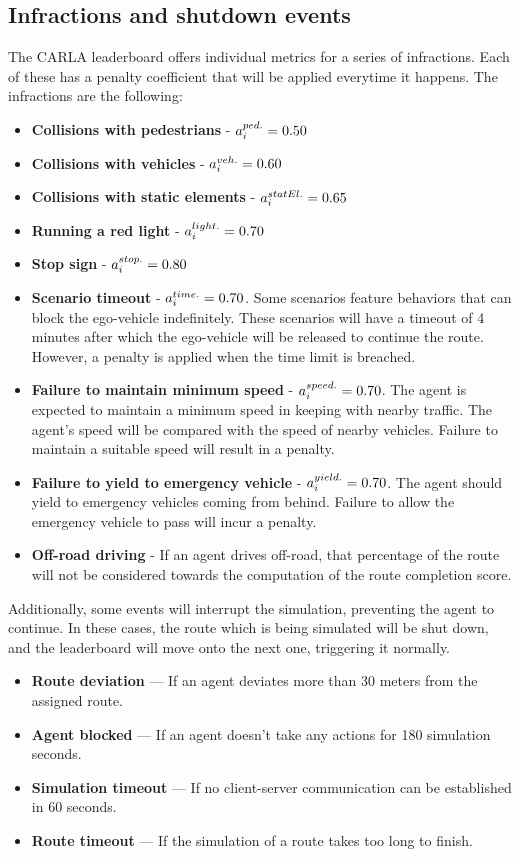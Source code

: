 \documentclass{article}
\begin{document}
\subsection{Infractions and shutdown events}
The CARLA leaderboard offers individual metrics for a series of infractions. Each of these has a penalty coefficient that will be applied everytime it happens. 
The infractions are the following:
\begin{itemize}
    \item \textbf{Collisions with pedestrians} - $a_{\small{i}}^{\small{ped.}} = 0.50$
    \item \textbf{Collisions with vehicles} - $a_{\small{i}}^{\small{veh.}} = 0.60$
    \item \textbf{Collisions with static elements} - $a_{\small{i}}^{\small{statEl.}} = 0.65$
    \item \textbf{Running a red light } - $a_{\small{i}}^{\small{light.}} = 0.70$
    \item \textbf{Stop sign} - $a_{\small{i}}^{\small{stop.}} = 0.80$
    \item \textbf{Scenario timeout} - $a_{\small{i}}^{\small{time.}} = 0.70$. Some scenarios feature behaviors that can block the ego-vehicle indefinitely. 
            These scenarios will have a timeout of 4 minutes after which the ego-vehicle will be released to continue the route. However, a penalty is applied when 
            the time limit is breached.
    \item \textbf{Failure to maintain minimum speed} - $a_{\small{i}}^{\small{speed.}} = 0.70$. The agent is expected to maintain a minimum speed in keeping with nearby traffic.
            The agent’s speed will be compared with the speed of nearby vehicles. Failure to maintain a suitable speed will result in a penalty.
    \item \textbf{Failure to yield to emergency vehicle} - $a_{\small{i}}^{\small{yield.}} = 0.70$. The agent should yield to emergency vehicles coming from behind. Failure to allow the emergency vehicle to pass will incur a penalty.
    \item \textbf{Off-road driving} - If an agent drives off-road, that percentage of the route will not be considered towards the computation of the route completion score.
\end{itemize}

Additionally, some events will interrupt the simulation, preventing the agent to continue. In these cases, the route which is being simulated will be shut down, and the 
leaderboard will move onto the next one, triggering it normally.
\begin{itemize}
    \item \textbf{Route deviation} — If an agent deviates more than 30 meters from the assigned route.
    \item \textbf{Agent blocked} — If an agent doesn’t take any actions for 180 simulation seconds.
    \item \textbf{Simulation timeout} — If no client-server communication can be established in 60 seconds.
    \item \textbf{Route timeout} — If the simulation of a route takes too long to finish.
\end{itemize}
\end{document}
